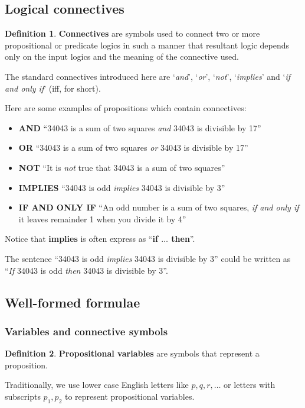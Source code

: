 \documentclass[11pt]{article}
\theoremstyle{definition}
\newtheorem{defn}{Definition}[subsection]
\begin{document}
\subsection{Logical connectives}
\begin{shaded}
\begin{defn}
    \textbf{Connectives} are symbols used to connect two or more propositional or predicate logics in such a manner that resultant logic depends only on the input logics and the meaning of the connective used.
\end{defn}    
\end{shaded}

The standard connectives introduced here are `\textit{and}', `\textit{or}', `\textit{not}', `\textit{implies}' and `\textit{if and only if}' (iff, for short).

Here are some examples of propositions which contain connectives:
\begin{itemize}
    \item \textbf{AND} ``34043 is a sum of two squares \textit{and} 34043 is divisible by 17''
    \item \textbf{OR} ``34043 is a sum of two squares \textit{or} 34043 is divisible by 17''
    \item \textbf{NOT} ``It is \textit{not} true that 34043 is a sum of two squares''
    \item \textbf{IMPLIES} ``34043 is odd \textit{implies} 34043 is divisible by 3''
    \item \textbf{IF AND ONLY IF} ``An odd number is a sum of two squares, \textit{if and only if} it leaves remainder 1 when you divide it by 4''
\end{itemize}

Notice that \textbf{implies} is often express as ``\textbf{if $\dots$ then}''.

The sentence ``34043 is odd \textit{implies} 34043 is divisible by 3'' could be written as ``\textit{If} 34043 is odd \textit{then} 34043 is divisible by 3''.

\subsection{Well-formed formulae}
\subsubsection{Variables and connective symbols}
\begin{shaded}
\begin{defn}
    \textbf{Propositional variables} are symbols that represent a proposition.
\end{defn}    
\end{shaded}
Traditionally, we use lower case English letters like $p,q,r,\dots$ or letters with subscripts $p_{1},p_{2}$ to represent propositional variables.
\end{document}
